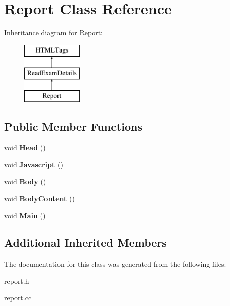 \hypertarget{classReport}{\section{Report Class Reference}
\label{classReport}
}
Inheritance diagram for Report\-:\begin{figure}[H]
\begin{center}
\leavevmode
\includegraphics[height=3.000000cm]{classReport}
\end{center}
\end{figure}
\subsection*{Public Member Functions}
\begin{DoxyCompactItemize}
\item 
\hypertarget{classReport_a6b5a749dcbc19cb71503c5a6e2d465d3}{void {\bfseries Head} ()}\label{classReport_a6b5a749dcbc19cb71503c5a6e2d465d3}

\item 
\hypertarget{classReport_a97998b106d6fb7d6ccfea849892d21ee}{void {\bfseries Javascript} ()}\label{classReport_a97998b106d6fb7d6ccfea849892d21ee}

\item 
\hypertarget{classReport_a28dfc98e680194276c2bbb2fa4decf86}{void {\bfseries Body} ()}\label{classReport_a28dfc98e680194276c2bbb2fa4decf86}

\item 
\hypertarget{classReport_abfacfc97c910b8c2bc1a1102cc623d80}{void {\bfseries Body\-Content} ()}\label{classReport_abfacfc97c910b8c2bc1a1102cc623d80}

\item 
\hypertarget{classReport_a35895231f3a27c3247f9498cda2b42fe}{void {\bfseries Main} ()}\label{classReport_a35895231f3a27c3247f9498cda2b42fe}

\end{DoxyCompactItemize}
\subsection*{Additional Inherited Members}


The documentation for this class was generated from the following files\-:\begin{DoxyCompactItemize}
\item 
report.\-h\item 
report.\-cc\end{DoxyCompactItemize}
